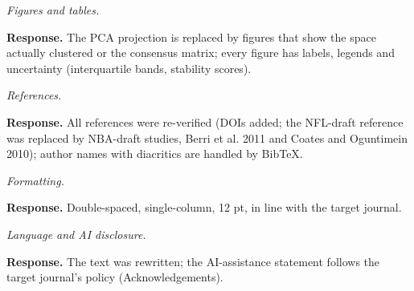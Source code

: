 \documentclass[11pt,a4paper]{article}
\newcommand{\point}[2]{\item[\textbf{#1}] \textit{#2}\par\vspace{2pt}}
\newcommand{\resp}{\par\noindent\textbf{Response.} }
\begin{document}
\begin{description}[leftmargin=1.2cm,style=nextline]
\point{23}{Figures and tables.}
\resp The PCA projection is replaced by figures that show the space actually clustered or the consensus matrix; every figure has labels, legends and uncertainty (interquartile bands, stability scores).

\point{24}{References.}
\resp All references were re-verified (DOIs added; the NFL-draft reference was replaced by NBA-draft studies, Berri et al. 2011 and Coates and Oguntimein 2010); author names with diacritics are handled by Bib\TeX.

\point{25}{Formatting.}
\resp Double-spaced, single-column, 12 pt, in line with the target journal.

\point{26}{Language and AI disclosure.}
\resp The text was rewritten; the AI-assistance statement follows the target journal's policy (Acknowledgements).
\end{description}
\end{document}
